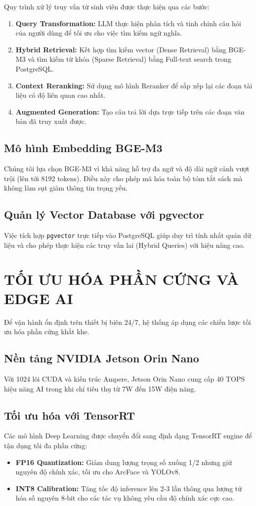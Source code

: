 \documentclass[12pt,a4paper]{article}
\begin{document}
Quy trình xử lý truy vấn từ sinh viên được thực hiện qua các bước:
\begin{enumerate}
    \item \textbf{Query Transformation:} LLM thực hiện phân tích và tinh chỉnh câu hỏi của người dùng để tối ưu cho việc tìm kiếm ngữ nghĩa.
    \item \textbf{Hybrid Retrieval:} Kết hợp tìm kiếm vector (Dense Retrieval) bằng BGE-M3 và tìm kiếm từ khóa (Sparse Retrieval) bằng Full-text search trong PostgreSQL.
    \item \textbf{Context Reranking:} Sử dụng mô hình Reranker để sắp xếp lại các đoạn tài liệu có độ liên quan cao nhất.
    \item \textbf{Augmented Generation:} Tạo câu trả lời dựa trực tiếp trên các đoạn văn bản đã truy xuất được.
\end{enumerate}

\subsection{Mô hình Embedding BGE-M3}
Chúng tôi lựa chọn BGE-M3 vì khả năng hỗ trợ đa ngữ và độ dài ngữ cảnh vượt trội (lên tới 8192 tokens). Điều này cho phép mã hóa toàn bộ tóm tắt sách mà không làm sụt giảm thông tin trọng yếu.

\subsection{Quản lý Vector Database với pgvector}
Việc tích hợp \texttt{pgvector} trực tiếp vào PostgreSQL giúp duy trì tính nhất quán dữ liệu và cho phép thực hiện các truy vấn lai (Hybrid Queries) với hiệu năng cao.

\section{TỐI ƯU HÓA PHẦN CỨNG VÀ EDGE AI}

Để vận hành ổn định trên thiết bị biên 24/7, hệ thống áp dụng các chiến lược tối ưu hóa phần cứng khắt khe.

\subsection{Nền tảng NVIDIA Jetson Orin Nano}
Với 1024 lõi CUDA và kiến trúc Ampere, Jetson Orin Nano cung cấp 40 TOPS hiệu năng AI trong khi chỉ tiêu thụ từ 7W đến 15W điện năng.

\subsection{Tối ưu hóa với TensorRT}
Các mô hình Deep Learning được chuyển đổi sang định dạng TensorRT engine để tận dụng tối đa phần cứng:
\begin{itemize}
    \item \textbf{FP16 Quantization:} Giảm dung lượng trọng số xuống 1/2 nhưng giữ nguyên độ chính xác, tối ưu cho ArcFace và YOLOv8.
    \item \textbf{INT8 Calibration:} Tăng tốc độ inference lên 2-3 lần thông qua lượng tử hóa số nguyên 8-bit cho các tác vụ không yêu cầu độ chính xác cực cao.
\end{itemize}
\end{document}
